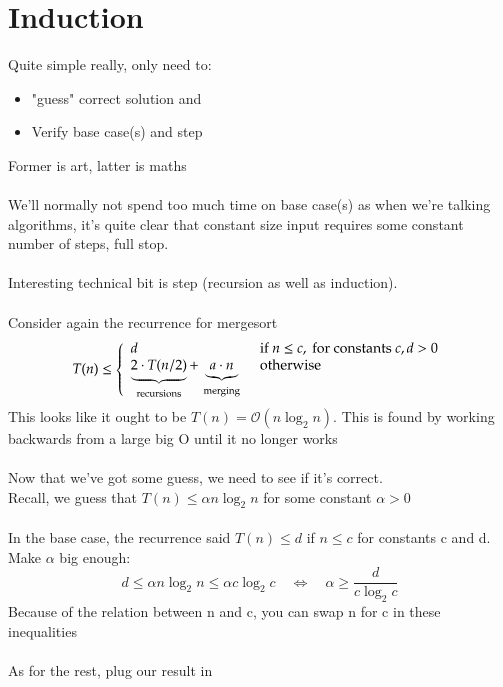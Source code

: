 \documentclass{article}[18pt]
\begin{document}
\section{Induction}
Quite simple really, only need to:
\begin{itemize}
	\item "guess" correct solution and
	\item Verify base case(s) and step
\end{itemize}
Former is art, latter is maths\\
\\
We'll normally not spend too much time on base case(s) as
when we're talking algorithms, it's quite clear that constant size
input requires some constant number of steps, full stop.\\
\\
Interesting technical bit is step (recursion as well as induction).\\
\\
Consider again the recurrence for mergesort
$$T ( n ) \leq \left\{ \begin{array} { l l } { d } & { \text { if } n \leq c , \text { for constants } c , d > 0 } \\ { \underbrace { 2 \cdot T ( n / 2 ) } _ { \text { recursions } } + \underbrace { a \cdot n } _ { \text { merging } } } & { \text { otherwise } } \end{array} \right.$$
This looks like it ought to be $T(n)=\mathcal{O}(n\log_2n)$. This is found by working backwards from a large big O until it no longer works\\
\\
Now that we've got some guess, we need to see if it's correct.\\
Recall, we guess that $T(n)\leqslant \alpha n\log_2n$ for some constant $\alpha>0$\\
\\
In the base case, the recurrence said $T(n)\leqslant d$ if $n\leqslant c$ for constants c and d. Make $\alpha$ big enough:
$$d \leq \alpha n \log _ { 2 } n \leq \alpha c \log _ { 2 } c \quad \Leftrightarrow \quad \alpha \geq \frac { d } { c \log _ { 2 } c }$$
Because of the relation between n and c, you can swap n for c in these inequalities\\
\\
As for the rest, plug our result in
\end{document}
